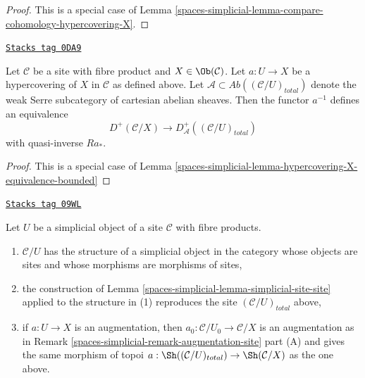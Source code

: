\begin{proof}
This is a special case of
Lemma \ref{spaces-simplicial-lemma-compare-cohomology-hypercovering-X}.
\end{proof}

\begin{lemma}
\label{spaces-simplicial-lemma-hypercovering-X-simple-equivalence-bounded}
\href{https://stacks.math.columbia.edu/tag/0DA9}{\texttt{Stacks tag 0DA9}}

Let $\mathcal{C}$ be a site with fibre product and $X \in \Ob(\mathcal{C})$.
Let $a : U \to X$ be a hypercovering of $X$ in $\mathcal{C}$ as defined above.
Let $\mathcal{A} \subset \textit{Ab}((\mathcal{C}/U)_{total})$
denote the weak Serre subcategory of cartesian abelian sheaves.
Then the functor $a^{-1}$ defines an equivalence
$$
D^+(\mathcal{C}/X) \longrightarrow D_\mathcal{A}^+((\mathcal{C}/U)_{total})
$$
with quasi-inverse $Ra_*$.
\end{lemma}

\begin{proof}
This is a special case of
Lemma \ref{spaces-simplicial-lemma-hypercovering-X-equivalence-bounded}
\end{proof}

\begin{lemma}
\label{spaces-simplicial-lemma-sr-when-fibre-products}
\href{https://stacks.math.columbia.edu/tag/09WL}{\texttt{Stacks tag 09WL}}

Let $U$ be a simplicial object of a site $\mathcal{C}$
with fibre products.
\begin{enumerate}
\item $\mathcal{C}/U$ has the structure of a simplicial object
in the category whose objects are sites and
whose morphisms are morphisms of sites,
\item the construction of Lemma \ref{spaces-simplicial-lemma-simplicial-site-site}
applied to the structure in (1)
reproduces the site $(\mathcal{C}/U)_{total}$ above,
\item if $a : U \to X$ is an augmentation, then
$a_0 : \mathcal{C}/U_0 \to \mathcal{C}/X$ is an augmentation
as in Remark \ref{spaces-simplicial-remark-augmentation-site} part (A) and gives the
same morphism of topoi
$a : \Sh((\mathcal{C}/U)_{total}) \to \Sh(\mathcal{C}/X)$
as the one above.
\end{enumerate}
\end{lemma}


